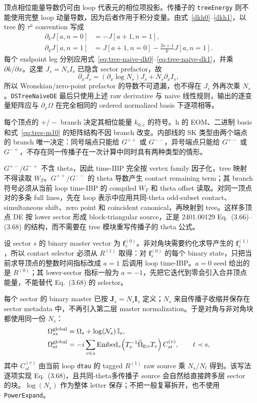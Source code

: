 ﻿\documentclass[a4paper,11pt]{article}
\begin{document}
顶点相位能量导数仍可由 loop 代表元的相位项投影。传播子的 \texttt{treeEnergy} 则不能使用完整 loop 动量导数，因为后者作用于积分变量。由式~\eqref{dkh0}--\eqref{dkh1}，以 tree 的 $\tau^a$ convention 写成
\begin{align}
 \partial_k J[a,n=0]&=-J[a+1,n=1],\label{eq:tree-naive-dk0}\\
 \partial_k J[a,n=1]&=J[a+1,n=0]-\frac{2\nu+1}{k}J[a,n=1].\label{eq:tree-naive-dk1}
\end{align}
每个 endpoint leg 分别应用式~\eqref{eq:tree-naive-dk0}--\eqref{eq:tree-naive-dk1}，并乘 $\partial k/\partial x$。这里 $J_s=N_sI_s$ 已隐含 sector prefactor，故
\begin{equation}
 \partial_xJ_s=(\partial_x\log N_s)J_s+N_s\partial_xI_s,
\end{equation}
所以 Wronskian/zero-point prefactor 的导数不可遗漏，也不得在 $J_s$ 外再次乘 $N_s$。\texttt{DSTreeNaiveDE} 最后只使用上述 raw derivative 与 naive 线性规则，输出的逐变量矩阵应与 $\partial_x\Omega$ 在完全相同的 ordered normalized basis 下逐项相等。

每个顶点的 $+/-$ branch 决定其相位能量 $k_{0;e}$ 的符号。h 的 EOM、二进制 basis 和式~\eqref{eq:tree-m10} 的矩阵结构不因 branch 改变。内部线的 SK 类型由两个端点的 branch 唯一决定：同号端点只能给 $G^{++}$ 或 $G^{--}$，异号端点只能给 $G^{+-}$ 或 $G^{-+}$，不存在同一传播子在一次计算中同时具有两种类型的情形。

$G^{+-}/G^{-+}$ 不含 theta，因此 time-IBP 完全按 vertex family 因子化，tree 映射不得读取 $W_T$。$G^{++}/G^{--}$ 的 theta 导数产生 contact remaining term；其 branch 符号必须从当前 loop time-IBP 的 compiled $W_T$ 和 theta offset 读取。对同一顶点对的多条 full lines，先在 loop 表示中应用共同-theta odd-subset contact、simultaneous shift、zero point 和 coincident canonical，再映射到 tree。这样多顶点 DE 按 lower sector 形成 block-triangular source，正是 2401.00129 Eq.~(3.66)--(3.68) 的结构，而不需要在 tree 模块重写传播子的 theta 公式。

设 sector $s$ 的 binary master vector 为 $\bm f_s^{(0)}$。非对角块需要约化求导产生的 $\bm f_s^{(1)}$，所以 contact selector 必须从 $R^{(1)}$ 取得：对 $\bm f_s^{(0)}$ 的每个 binary state，只把当前求导顶点的整数时间指标改成 $a=1$ 后调用 loop time-IBP。$a=0$ seed 给出的是 $R^{(0)}$；其 lower-sector 指标一般为 $a=-1$，先把它迭代到零会引入合并顶点能量，不能替代 Eq.~(3.68) 的 selector。

每个 sector 的 binary master 已按 $\bm J_s=N_s\bm I_s$ 定义；$N_s$ 来自传播子收缩并保存在 sector metadata 中，不再引入第二层 master normalization。于是对角与非对角块都使用同一份 $N_s$：
\begin{align}
 \Omega_{ss}^{\rm global}&=\Omega_s+\log(\mathcal N_s)\,\mathbb I_s,\\
 \Omega_{st}^{\rm global}&=-i\sum_{v\in s}
 \operatorname{Embed}_v\!\left(T_v^{-1}\widetilde\Omega_{0;v}T_v\right)
 C_{st}^{(v)},\qquad t\prec s,
 \label{eq:tree-sector-offdiagonal}
\end{align}
其中 $C_{st}^{(v)}$ 由当前 loop \texttt{dtau} 的 tagged $R^{(1)}$ raw source 乘 $N_s/N_t$ 得到。该写法逐项实现 Eq.~(3.68)，且共同-theta多传播子 source 会自然给直接跨多层 sector 的块。$\log(N_s)$ 作为整体 letter 保存；不把一般复幂拆开，也不使用 \texttt{PowerExpand}。
\end{document}
